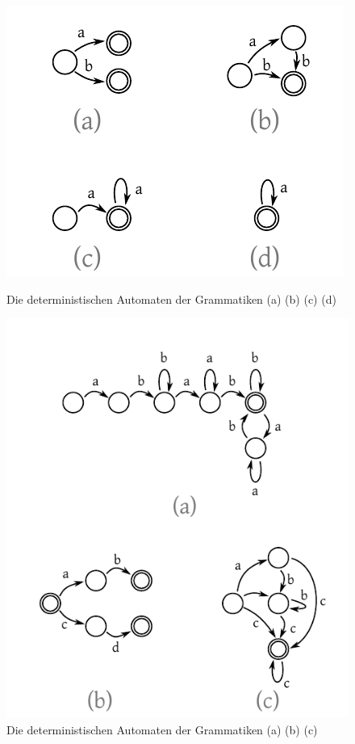 \begin{figure}[p]
 \begin{center}
  \includegraphics{img/basic_deterministic_automatons.pdf}
  \caption{
    Die deterministischen Automaten der Grammatiken
    (a)  (b)  (c)  (d) 
  }
  \label{fig:basic_automatons}
 \end{center}
 \begin{center}
  \includegraphics{img/deterministic_automatons.pdf}
  \caption{Die deterministischen Automaten der Grammatiken
    (a)  (b)  (c) }
  \label{fig:example_automatons}
 \end{center}
\end{figure}

